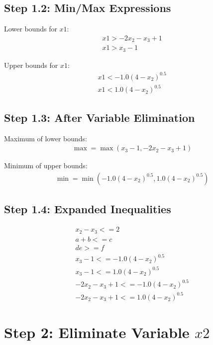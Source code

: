 \documentclass{article}
\begin{document}
\subsection{Step 1.2: Min/Max Expressions}

Lower bounds for $x1$:
\begin{align}
& x1 > - 2 x_{2} - x_{3} + 1 \\
& x1 > x_{3} - 1
\end{align}

Upper bounds for $x1$:
\begin{align}
& x1 < - 1.0 \left(4 - x_{2}\right)^{0.5} \\
& x1 < 1.0 \left(4 - x_{2}\right)^{0.5}
\end{align}

\subsection{Step 1.3: After Variable Elimination}

Maximum of lower bounds:
\begin{align}
& \max = \max\left(x_{3} - 1, - 2 x_{2} - x_{3} + 1\right)
\end{align}

Minimum of upper bounds:
\begin{align}
& \min = \min\left(- 1.0 \left(4 - x_{2}\right)^{0.5}, 1.0 \left(4 - x_{2}\right)^{0.5}\right)
\end{align}

\subsection{Step 1.4: Expanded Inequalities}

\begin{align}
& x_{2} - x_{3} <= 2 \\
& a + b <= c \\
& d e >= f \\
& x_{3} - 1 <= - 1.0 \left(4 - x_{2}\right)^{0.5} \\
& x_{3} - 1 <= 1.0 \left(4 - x_{2}\right)^{0.5} \\
& - 2 x_{2} - x_{3} + 1 <= - 1.0 \left(4 - x_{2}\right)^{0.5} \\
& - 2 x_{2} - x_{3} + 1 <= 1.0 \left(4 - x_{2}\right)^{0.5}
\end{align}

\section{Step 2: Eliminate Variable $x2$}
\end{document}
